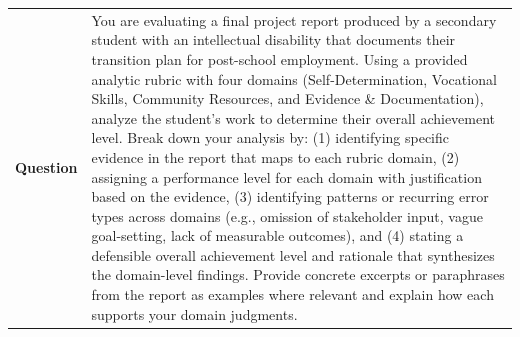 \begin{longtable}{@{}l p{12.5cm}@{}}
  \textbf{Question} & You are evaluating a final project report produced by a secondary student with an intellectual disability that documents their transition plan for post-school employment. Using a provided analytic rubric with four domains (Self-Determination, Vocational Skills, Community Resources, and Evidence \& Documentation), analyze the student's work to determine their overall achievement level. Break down your analysis by: (1) identifying specific evidence in the report that maps to each rubric domain, (2) assigning a performance level for each domain with justification based on the evidence, (3) identifying patterns or recurring error types across domains (e.g., omission of stakeholder input, vague goal-setting, lack of measurable outcomes), and (4) stating a defensible overall achievement level and rationale that synthesizes the domain-level findings. Provide concrete excerpts or paraphrases from the report as examples where relevant and explain how each supports your domain judgments. \\

\end{longtable}
